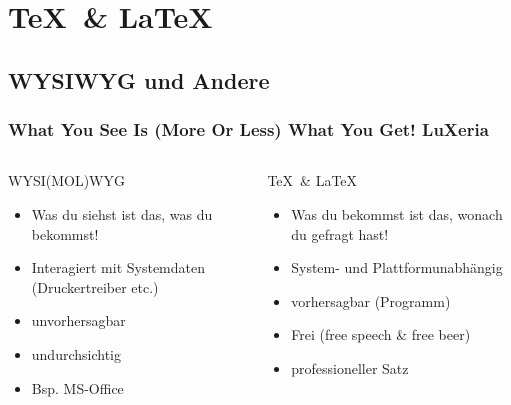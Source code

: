 \section{\TeX~\& \LaTeX}
\begin{frame}
    \frametitle{}
    \tableofcontents[currentsection]
\end{frame}

\subsection{WYSIWYG und Andere}
\begin{frame}
    \frametitle{What You See Is (More Or Less) What You Get! \hfill{} \footnotesize{LuXeria}}
    \begin{columns}
        \begin{column}{5cm}
            \begin{alertblock}{WYSI(MOL)WYG}
                \begin{itemize}
                    \item Was du siehst ist das, was du bekommst!
                    \item Interagiert mit Systemdaten (Druckertreiber etc.)
                    \item unvorhersagbar
                    \item undurchsichtig
                    \item Bsp. MS-Office
                \end{itemize}
            \end{alertblock}
        \end{column}
        \begin{column}{5cm}
            \begin{exampleblock}{\TeX~\& \LaTeX}
                \begin{itemize}
                    \item Was du bekommst ist das, wonach du gefragt hast!
                    \item System- und Plattformunabhängig
                    \item vorhersagbar (Programm)
                    \item Frei (free speech \& free beer)
                    \item professioneller Satz
                \end{itemize}
            \end{exampleblock}
        \end{column}
    \end{columns}
\end{frame}

